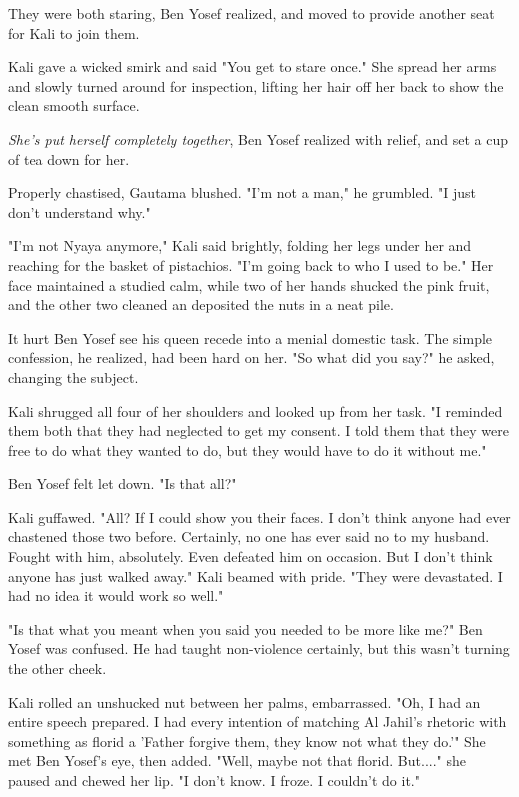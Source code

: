 \documentclass{amsart}
\begin{document}
They were both staring, Ben Yosef realized, and moved to provide another seat for Kali to join them. 

Kali gave a wicked smirk and said "You get to stare once." She spread her arms and slowly turned around for inspection, lifting her hair off her back to show the clean smooth surface. 

\emph{She's put herself completely together}, Ben Yosef realized with relief, and set a cup of tea down for her.

Properly chastised, Gautama blushed. "I'm not a man," he grumbled. "I just don't understand why."

"I'm not Nyaya anymore," Kali said brightly, folding her legs under her and reaching for the basket of pistachios. "I'm going back to who I used to be." Her face maintained a studied calm, while two of her hands shucked the pink fruit, and the other two cleaned an deposited the nuts in a neat pile.

It hurt Ben Yosef see his queen recede into a menial domestic task. The simple confession, he realized, had been hard on her. "So what did you say?" he asked, changing the subject. 

Kali shrugged all four of her shoulders and looked up from her task. "I reminded them both that they had neglected to get my consent. I told them that they were free to do what they wanted to do, but they would have to do it without me." 

Ben Yosef felt let down. "Is that all?"

Kali guffawed. "All? If I could show you their faces. I don't think anyone had ever chastened those two before. Certainly, no one has ever said no to my husband. Fought with him, absolutely. Even defeated him on occasion. But I don't think anyone has just walked away." Kali beamed with pride. "They were devastated. I had no idea it would work so well." 

"Is that what you meant when you said you needed to be more like me?" Ben Yosef was confused. He had taught non-violence certainly, but this wasn't turning the other cheek.

Kali rolled an unshucked nut between her palms, embarrassed. "Oh, I had an entire speech prepared. I had every intention of matching Al Jahil's rhetoric with something as florid a 'Father forgive them, they know not what they do.'" She met Ben Yosef's eye, then added. "Well, maybe not that florid. But...." she paused and chewed her lip. "I don't know. I froze. I couldn't do it."
\end{document}
